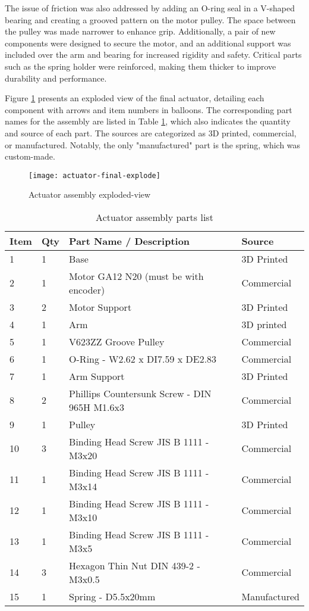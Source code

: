 The issue of friction was also addressed by adding an O-ring seal in a V-shaped bearing and creating a grooved pattern on the motor pulley. The space between the pulley was made narrower to enhance grip. Additionally, a pair of new components were designed to secure the motor, and an additional support was included over the arm and bearing for increased rigidity and safety. Critical parts such as the spring holder were reinforced, making them thicker to improve durability and performance.

Figure \ref{fig:final-actuator-explode} presents an exploded view of the final actuator, detailing each component with arrows and item numbers in balloons. The corresponding part names for the assembly are listed in Table \ref{tab:final-actuator-parts}, which also indicates the quantity and source of each part. The sources are categorized as 3D printed, commercial, or manufactured. Notably, the only "manufactured" part is the spring, which was custom-made.

\begin{figure}[H]
    \centering
    \texttt{[image: actuator-final-explode]}
    \caption{Actuator assembly exploded-view}
    \label{fig:final-actuator-explode}
\end{figure}
\begin{table}[H]
    \centering
    \caption{Actuator assembly parts list}
    \label{tab:final-actuator-parts}
    \begin{tabular}{llll}
    \toprule
    Item & Qty & Part Name / Description & Source \\
    \midrule
    1 & 1 & Base & 3D Printed \\
    2 & 1 & Motor GA12 N20 (must be with encoder) & Commercial \\
    3 & 2 & Motor Support & 3D Printed \\
    4 & 1 & Arm & 3D printed \\
    5 & 1 & V623ZZ Groove Pulley & Commercial \\
    6 & 1 & O-Ring - W2.62 x DI7.59 x DE2.83 & Commercial \\
    7 & 1 & Arm Support & 3D Printed \\
    8 & 2 & Phillips Countersunk Screw - DIN 965H M1.6x3 & Commercial \\
    9 & 1 & Pulley & 3D Printed \\
    10 & 3 & Binding Head Screw JIS B 1111 - M3x20 & Commercial \\
    11 & 1 & Binding Head Screw JIS B 1111 - M3x14 & Commercial \\
    12 & 1 & Binding Head Screw JIS B 1111 - M3x10 & Commercial \\
    13 & 1 & Binding Head Screw JIS B 1111 - M3x5 & Commercial \\
    14 & 3 & Hexagon Thin Nut DIN 439-2 - M3x0.5 & Commercial \\
    15 & 1 & Spring - D5.5x20mm & Manufactured \\
    \bottomrule
    \end{tabular}
\end{table}


